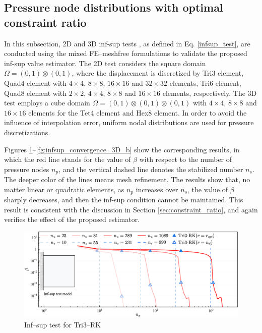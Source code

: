 \subsection{Pressure node distributions with optimal constraint ratio}

In this subsection, 2D and 3D inf-sup tests \cite{chapelle1993}, as defined in Eq. \ref{infsup_test}, are conducted using the mixed FE–meshfree formulations to validate the proposed inf-sup value estimator.
The 2D test considers the square domain $\Omega = (0,1)\otimes (0,1)$, where the displacement is discretized by Tri3 element, Quad4 element with $4\times 4$, $8\times 8$, $16\times 16$ and $32\times 32$ elements, Tri6 element, Quad8 element with $2\times 2$, $4\times 4$, $8\times 8$ and $16\times 16$ elements, respectively. The 3D test employs a cube domain $\Omega = (0,1)\otimes (0,1)\otimes (0,1)$ with $4\times 4$, $8\times 8$ and $16\times 16$ elements for the Tet4 element and Hex8 element. In order to avoid the influence of interpolation error, uniform nodal distributions are used for pressure discretizations.

Figures \ref{fg:infsup_convergence_2D_a}--\ref{fg:infsup_convergence_3D_b} show the corresponding results, in which the red line stands for the value of $\beta$ with respect to the number of pressure nodes $n_p$, and the vertical dashed line denotes the stabilized number $n_s$. The deeper color of the lines means mesh refinement. The results show that, no matter linear or quadratic elements, as $n_p$ increases over $n_s$, the value of $\beta$ sharply decreases, and then the inf-sup condition cannot be maintained. This result is consistent with the discussion in Section \ref{sec:constraint_ratio}, and again verifies the effect of the proposed estimator.

\begin{figure}[H]
\centering
\includegraphics[width=\textwidth]{png/tri3.png}
\caption{Inf--sup test for Tri3--RK}\label{fg:infsup_convergence_2D_a}
\end{figure}

